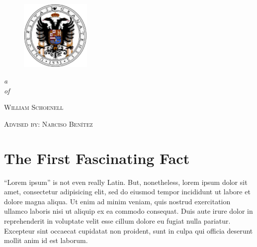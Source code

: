 \documentclass[9pt]{memoir}
\begin{document}
\frontmatter
\thispagestyle{empty}

\begin{figure}
	\vspace{-10pt}
	\begin{adjustwidth*}{-1in}{0pt}
		\centering
		\includegraphics[width=0.3\textwidth]{figures/Escudo_de_la_Universidad_de_Granada.pdf}
	\end{adjustwidth*}
	\vspace{-15pt}
\end{figure}


\begin{adjustwidth*}{-1in}{0pt}
	\centering
	 \par
	 \par
\end{adjustwidth*}

\mbox{}\vspace{1.8in}
\noindent
\begin{flushright}
{\LARGE\itshape{}a}\\[2\baselineskip]
{\LARGE\itshape{}of}
\end{flushright}

\vspace{6\baselineskip}
\hfill{\LARGE\scshape{}William Schoenell}

\vspace{1\baselineskip}
\hfill{\Large\scshape{}Advised by: Narciso Ben\'\i tez}


\cleartorecto\tableofcontents*

\mainmatter

\chapter{The First Fascinating Fact}
``Lorem ipsum'' is not even really Latin. But, nonetheless, lorem ipsum dolor sit amet, consectetur adipisicing elit, sed do eiusmod tempor incididunt ut labore et dolore magna aliqua. Ut enim ad minim veniam, quis nostrud exercitation ullamco laboris nisi ut aliquip ex ea commodo consequat. Duis aute irure dolor in reprehenderit in voluptate velit esse cillum dolore eu fugiat nulla pariatur. Excepteur sint occaecat cupidatat non proident, sunt in culpa qui officia deserunt mollit anim id est laborum.
\end{document}
